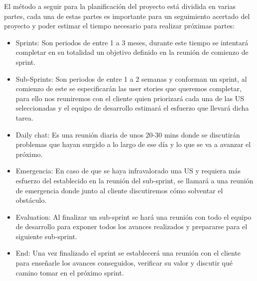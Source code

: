 El método a seguir para la planificación del proyecto está dividida en varias partes, cada una de estas partes es importante para un seguimiento acertado del proyecto y poder estimar el tiempo necesario para realizar próximas partes:
\begin{itemize}
    \item Sprints: Son periodos de entre 1 a 3 meses, durante este tiempo se intentará completar en su totalidad un objetivo definido en la reunión de comienzo de sprint.
    \item Sub-Sprints: Son periodos de entre 1 a 2 semanas y conforman un sprint, al comienzo de este se especificarán las user stories que queremos completar, para ello nos reuniremos con el cliente quien priorizará cada una de las US seleccionadas y el equipo de desarrollo estimará el esfuerzo que llevará dicha tarea.
    \item Daily chat: Es una reunión diaria de unos 20-30 mins donde se discutirán problemas que hayan surgido a lo largo de ese día y lo que se va a avanzar el próximo.
    \item Emergencia: En caso de que se haya infravalorado una US y requiera más esfuerzo del establecido en la reunión del sub-sprint, se llamará a una reunión de emergencia donde junto al cliente discutiremos cómo solventar el obstáculo.
    \item Evaluation: Al finalizar un sub-sprint se hará una reunión con todo el equipo de desarrollo para exponer todos los avances realizados y prepararse para el siguiente sub-sprint.
    \item End: Una vez finalizado el sprint se establecerá una reunión con el cliente para enseñarle los avances conseguidos, verificar su valor y discutir qué camino tomar en el próximo sprint.
\end{itemize}

